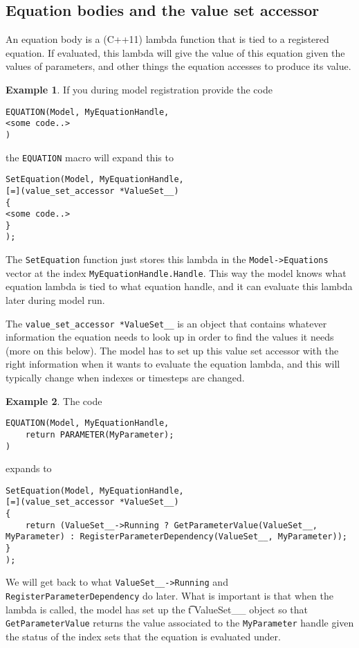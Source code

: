 \documentclass[11pt]{article}
\theoremstyle{definition}
\newtheorem{myexample}{Example}
\newenvironment{example}%
  {\begin{lrbox}{\examplebox}%
   \begin{minipage}{\dimexpr\linewidth-2\fboxsep}
   \begin{myexample}}%
  {\end{myexample}%
   \end{minipage}%
   \end{lrbox}%
   \begin{trivlist}
     \item[]\colorbox{silver}{\usebox\examplebox}
   \end{trivlist}}
\begin{document}
\subsection{Equation bodies and the value set accessor}

An equation body is a (C++11) lambda function that is tied to a registered equation. If evaluated, this lambda will give the value of this equation given the values of parameters, and other things the equation accesses to produce its value.

\begin{example}
If you during model registration provide the code
\begin{lstlisting}[style=mycpp]
EQUATION(Model, MyEquationHandle,
<some code..>
)
\end{lstlisting}
the {\tt EQUATION} macro will expand this to
\begin{lstlisting}[style=mycpp]
SetEquation(Model, MyEquationHandle,
[=](value_set_accessor *ValueSet__)
{
<some code..>
}
);
\end{lstlisting}
\end{example}
The {\tt SetEquation} function just stores this lambda in the {\tt Model->Equations} vector at the index {\tt MyEquationHandle.Handle}. This way the model knows what equation lambda is tied to what equation handle, and it can evaluate this lambda later during model run.

The {\tt value\_set\_accessor *ValueSet\_\_} is an object that contains whatever information the equation needs to look up in order to find the values it needs (more on this below). The model has to set up this value set accessor with the right information when it wants to evaluate the equation lambda, and this will typically change when indexes or timesteps are changed.

\begin{example}
The code
\begin{lstlisting}[style=mycpp]
EQUATION(Model, MyEquationHandle,
	return PARAMETER(MyParameter);
)
\end{lstlisting}
expands to
\begin{lstlisting}[style=mycpp]
SetEquation(Model, MyEquationHandle,
[=](value_set_accessor *ValueSet__)
{
	return (ValueSet__->Running ? GetParameterValue(ValueSet__, MyParameter) : RegisterParameterDependency(ValueSet__, MyParameter));
}
);
\end{lstlisting}
\end{example}
We will get back to what {\tt ValueSet\_\_->Running} and {\tt RegisterParameterDependency} do later. What is important is that when the lambda is called, the model has set up the {\t t ValueSet\_\_} object so that {\tt GetParameterValue} returns the value associated to the {\tt MyParameter} handle given the status of the index sets that the equation is evaluated under.
\end{document}
